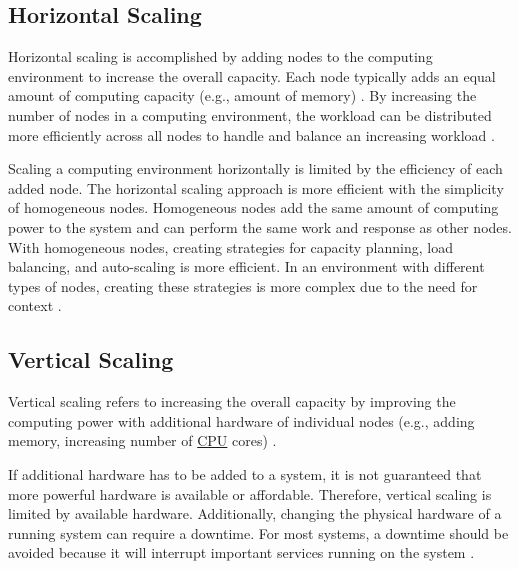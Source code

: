 \subsection{Horizontal Scaling}
\label{subsec:02_foundations_scalability_horizontal-scaling}
Horizontal scaling is accomplished by adding nodes to the computing environment to increase the overall capacity.
Each node typically adds an equal amount of computing capacity (e.g., amount of memory) \cite{Wilder2012CloudPatterns}.
By increasing the number of nodes in a computing environment, the workload can be distributed more efficiently across all nodes to handle and balance an increasing workload \cite{Wilder2012CloudPatterns, Abbott2015ScalabilityArt}.


Scaling a computing environment horizontally is limited by the efficiency of each added node.
The horizontal scaling approach is more efficient with the simplicity of homogeneous nodes.
Homogeneous nodes add the same amount of computing power to the system and can perform the same work and response as other nodes.
With homogeneous nodes, creating strategies for capacity planning, load balancing, and auto-scaling is more efficient.
In an environment with different types of nodes, creating these strategies is more complex due to the need for context \cite{Wilder2012CloudPatterns}.


\subsection{Vertical Scaling}
\label{subsec:02_foundations_scalability_vertical-scaling}
Vertical scaling refers to increasing the overall capacity by improving the computing power with additional hardware of individual nodes (e.g., adding memory, increasing number of \hyperlink{abbr:cpu}{CPU} cores) \cite{Wilder2012CloudPatterns}.


If additional hardware has to be added to a system, it is not guaranteed that more powerful hardware is available or affordable.
Therefore, vertical scaling is limited by available hardware.
Additionally, changing the physical hardware of a running system can require a downtime. For most systems, a downtime should be avoided because it will interrupt important services running on the system \cite{Wilder2012CloudPatterns}.


